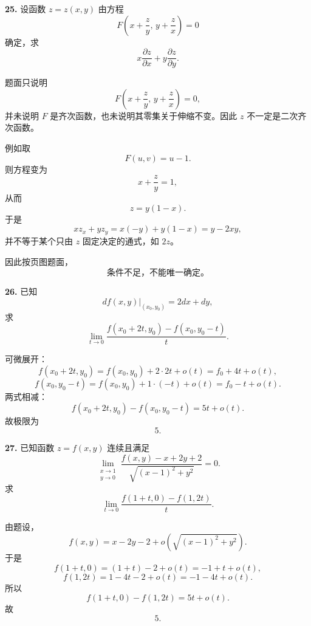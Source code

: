 \begin{problemblock}
\textbf{25.} 设函数 \(z=z(x,y)\) 由方程
\[
F\left(x+\frac{z}{y},\,y+\frac{z}{x}\right)=0
\]
确定，求
\[
x\frac{\partial z}{\partial x}+y\frac{\partial z}{\partial y}.
\]
\end{problemblock}

\begin{solutionblock}
题面只说明
\[
F\left(x+\frac{z}{y},\,y+\frac{z}{x}\right)=0,
\]
并未说明 \(F\) 是齐次函数，也未说明其零集关于伸缩不变。因此 \(z\) 不一定是二次齐次函数。

例如取
\[
F(u,v)=u-1.
\]
则方程变为
\[
x+\frac{z}{y}=1,
\]
从而
\[
z=y(1-x).
\]
于是
\[
xz_x+yz_y=x(-y)+y(1-x)=y-2xy,
\]
并不等于某个只由 \(z\) 固定决定的通式，如 \(2z\)。

因此按页图题面，
\[
\boxed{\text{条件不足，不能唯一确定。}}
\]
\end{solutionblock}

\begin{problemblock}
\textbf{26.} 已知
\[
df(x,y)\big|_{(x_0,y_0)}=2dx+dy,
\]
求
\[
\lim_{t\to0}\frac{f(x_0+2t,y_0)-f(x_0,y_0-t)}{t}.
\]
\end{problemblock}

\begin{solutionblock}
可微展开：
\[
f(x_0+2t,y_0)=f(x_0,y_0)+2\cdot 2t+o(t)
=f_0+4t+o(t),
\]
\[
f(x_0,y_0-t)=f(x_0,y_0)+1\cdot(-t)+o(t)
=f_0-t+o(t).
\]
两式相减：
\[
f(x_0+2t,y_0)-f(x_0,y_0-t)=5t+o(t).
\]
故极限为
\[
\boxed{5}.
\]
\end{solutionblock}

\begin{problemblock}
\textbf{27.} 已知函数 \(z=f(x,y)\) 连续且满足
\[
\lim_{\substack{x\to1\\y\to0}}
\frac{f(x,y)-x+2y+2}{\sqrt{(x-1)^2+y^2}}=0.
\]
求
\[
\lim_{t\to0}\frac{f(1+t,0)-f(1,2t)}{t}.
\]
\end{problemblock}

\begin{solutionblock}
由题设，
\[
f(x,y)=x-2y-2+o\left(\sqrt{(x-1)^2+y^2}\right).
\]
于是
\[
f(1+t,0)=(1+t)-2+o(t)=-1+t+o(t),
\]
\[
f(1,2t)=1-4t-2+o(t)=-1-4t+o(t).
\]
所以
\[
f(1+t,0)-f(1,2t)=5t+o(t).
\]
故
\[
\boxed{5}.
\]
\end{solutionblock}

